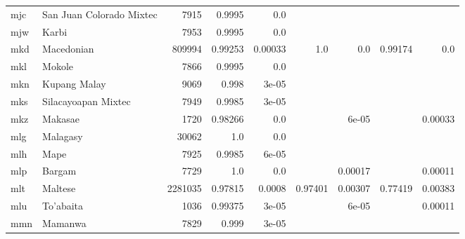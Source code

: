 \documentclass[11pt]{article}
\begin{document}
\begin{table*}[h]
{\begin{tabular}{llrrrrrrr}
mjc         & San Juan Colorado Mixtec         & 7915         & 0.9995         & 0.0         &          &          &          &          \\

mjw         & Karbi         & 7953         & 0.9995         & 0.0         &          &          &          &          \\

mkd         & Macedonian         & 809994         & 0.99253         & 0.00033         & 1.0         & 0.0         & 0.99174         & 0.0         \\

mkl         & Mokole         & 7866         & 0.9995         & 0.0         &          &          &          &          \\

mkn         & Kupang Malay         & 9069         & 0.998         & 3e-05         &          &          &          &          \\

mks         & Silacayoapan Mixtec         & 7949         & 0.9985         & 3e-05         &          &          &          &          \\

mkz         & Makasae         & 1720         & 0.98266         & 0.0         &          & 6e-05         &          & 0.00033         \\

mlg         & Malagasy         & 30062         & 1.0         & 0.0         &          &          &          &          \\

mlh         & Mape         & 7925         & 0.9985         & 6e-05         &          &          &          &          \\

mlp         & Bargam         & 7729         & 1.0         & 0.0         &          & 0.00017         &          & 0.00011         \\

mlt         & Maltese         & 2281035         & 0.97815         & 0.0008         & 0.97401         & 0.00307         & 0.77419         & 0.00383         \\

mlu         & To'abaita         & 1036         & 0.99375         & 3e-05         &          & 6e-05         &          & 0.00011         \\

mmn         & Mamanwa         & 7829         & 0.999         & 3e-05         &          &          &          &          \\


\end{tabular}}
\end{table*}
\end{document}
